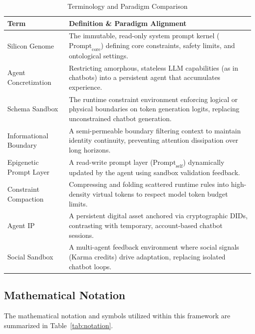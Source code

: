 \documentclass[10pt,journal,compsoc]{IEEEtran}
\begin{document}
\begin{table}[t]
\centering
\caption{Terminology and Paradigm Comparison}
\label{tab:comparison}
\begin{tabular}{lp{12cm}}
\toprule
\textbf{Term} & \textbf{Definition \& Paradigm Alignment} \\
\midrule
Silicon Genome & The immutable, read-only system prompt kernel ($\text{Prompt}_{\text{core}}$) defining core constraints, safety limits, and ontological settings. \\
\midrule
Agent Concretization & Restricting amorphous, stateless LLM capabilities (as in chatbots) into a persistent agent that accumulates experience. \\
\midrule
Schema Sandbox & The runtime constraint environment enforcing logical or physical boundaries on token generation logits, replacing unconstrained chatbot generation. \\
\midrule
Informational Boundary & A semi-permeable boundary filtering context to maintain identity continuity, preventing attention dissipation over long horizons. \\
\midrule
Epigenetic Prompt Layer & A read-write prompt layer ($\text{Prompt}_{\text{self}}$) dynamically updated by the agent using sandbox validation feedback. \\
\midrule
Constraint Compaction & Compressing and folding scattered runtime rules into high-density virtual tokens to respect model token budget limits. \\
\midrule
Agent IP & A persistent digital asset anchored via cryptographic DIDs, contrasting with temporary, account-based chatbot sessions. \\
\midrule
Social Sandbox & A multi-agent feedback environment where social signals (Karma credits) drive adaptation, replacing isolated chatbot loops. \\
\bottomrule
\end{tabular}
\end{table}

\subsection{Mathematical Notation}
The mathematical notation and symbols utilized within this framework are summarized in Table~\ref{tab:notation}.
\end{document}
